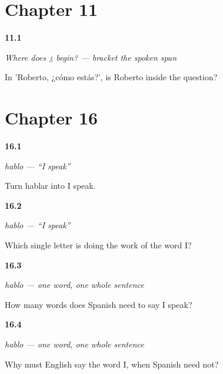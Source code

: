\section*{Chapter 11}

\noindent\begin{minipage}[t]{\linewidth}
\raggedright
\hypertarget{review-ES-W03-question-span-roberto-outside}{\textbf{11.1}} \emph{Where does ¿ begin? — bracket the spoken span}\par
\small In 'Roberto, ¿cómo estás?', is Roberto inside the question?
\end{minipage}\par\medskip

\section*{Chapter 16}

\noindent\begin{minipage}[t]{\linewidth}
\raggedright
\hypertarget{review-ES-C06-hablo-form}{\textbf{16.1}} \emph{hablo — \textquotedblleft{}I speak\textquotedblright{}}\par
\small Turn hablar into I speak.
\end{minipage}\par\medskip

\noindent\begin{minipage}[t]{\linewidth}
\raggedright
\hypertarget{review-ES-C06-hablo-ending}{\textbf{16.2}} \emph{hablo — \textquotedblleft{}I speak\textquotedblright{}}\par
\small Which single letter is doing the work of the word I?
\end{minipage}\par\medskip

\noindent\begin{minipage}[t]{\linewidth}
\raggedright
\hypertarget{review-ES-C06-pro-drop-count}{\textbf{16.3}} \emph{hablo — one word, one whole sentence}\par
\small How many words does Spanish need to say I speak?
\end{minipage}\par\medskip

\noindent\begin{minipage}[t]{\linewidth}
\raggedright
\hypertarget{review-ES-C06-pro-drop-why}{\textbf{16.4}} \emph{hablo — one word, one whole sentence}\par
\small Why must English say the word I, when Spanish need not?
\end{minipage}\par\medskip

